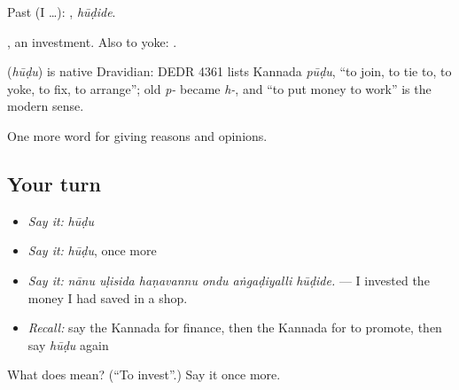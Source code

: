 Past (I …): , \emph{hūḍide}.

, an investment. Also to yoke:  .

\begin{cousinweb}
\textbf{} (\emph{hūḍu}) is native Dravidian: DEDR 4361 lists Kannada \emph{pūḍu}, \textquotedblleft{}to join, to tie to, to yoke, to fix, to arrange\textquotedblright{}; old \emph{p-} became \emph{h-}, and \textquotedblleft{}to put money to work\textquotedblright{} is the modern sense.
\end{cousinweb}

\begin{grammarlens}[title={What you've built}]
One more word for giving reasons and opinions.
\end{grammarlens}

\subsection*{Your turn}
\begin{itemize}
\raggedright
  \item \emph{Say it:} \emph{hūḍu}
  \item \emph{Say it:} \emph{hūḍu}, once more
  \item \emph{Say it:} \emph{nānu uḷisida haṇavannu ondu aṅgaḍiyalli hūḍide.} — I invested the money I had saved in a shop.
  \item \emph{Recall:} say the Kannada for finance, then the Kannada for to promote, then say \emph{hūḍu} again
\end{itemize}

\begin{tcolorbox}[breakable,colback=teal!4,colframe=teal!35!black,title={Before you move on}]
What does  mean? (\textquotedblleft{}To invest\textquotedblright{}.) Say it once more.
\end{tcolorbox}
